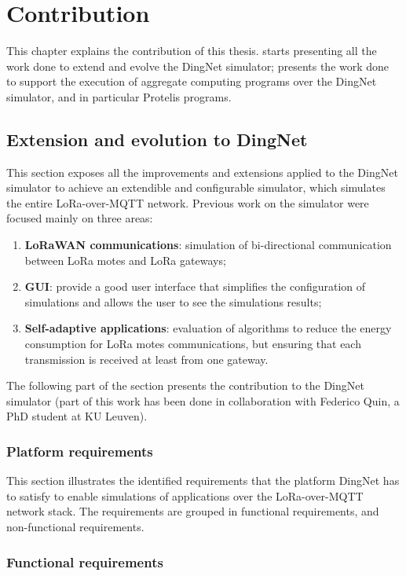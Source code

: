 \chapter{Contribution}
\label{chap:contribution}
This chapter explains the contribution of this thesis.  starts presenting all the work done to extend and evolve the DingNet simulator;  presents  the work done to support the execution of aggregate computing programs over the DingNet simulator, and in particular Protelis programs. 

\section{Extension and evolution to DingNet}
\label{sec:contributionDingNet}
This section exposes all the improvements and extensions applied to the DingNet simulator to achieve an extendible and configurable simulator, which simulates the entire LoRa-over-MQTT network. 
Previous work on the simulator were focused mainly on three areas:
\begin{enumerate}
    \item \textbf{LoRaWAN communications}: simulation of bi-directional communication between LoRa motes and LoRa gateways;
    \item \textbf{GUI}: provide a good user interface that simplifies the configuration of simulations and allows the user to see the simulations results;
    \item \textbf{Self-adaptive applications}: evaluation of algorithms to reduce the energy consumption for LoRa motes communications, but ensuring that each transmission is received at least from one gateway.
\end{enumerate}
The following part of the section presents the contribution to the DingNet simulator (part of this work has been done in collaboration with Federico Quin, a PhD student at KU Leuven).
\clearpage
\subsection{Platform requirements}

This section illustrates the identified requirements that the platform DingNet has to satisfy to enable simulations of applications over the LoRa-over-MQTT network stack.
The requirements are grouped in functional requirements, and non-functional requirements.

\subsection*{Functional requirements}

